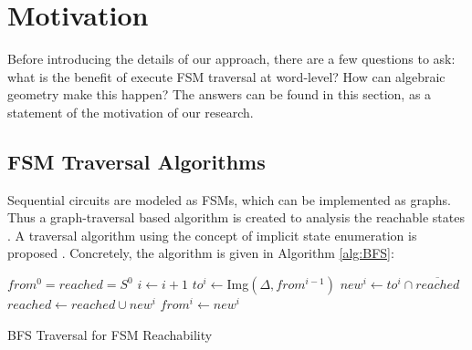 \section{Motivation}
Before introducing the details of our approach, there are a few questions to ask: what is 
the benefit of execute FSM traversal at word-level? How can algebraic geometry make this happen?
The answers can be found in this section, as a statement of the motivation of our research.

\subsection{FSM Traversal Algorithms}
Sequential circuits are modeled as FSMs, which can be implemented as graphs. Thus a 
graph-traversal based algorithm is created to analysis the reachable states \cite{coudert2003unified}.
A traversal algorithm using the concept of implicit state enumeration is proposed \cite{cho1993redundancy}.
Concretely, the algorithm is given in Algorithm \ref{alg:BFS}:

% 

\IncMargin{1em}
\begin{algorithm}[hbt]
\SetAlgoNoLine
\LinesNumbered
\Indm
\Indp

  $from^0 = reached = S^0$\;
  {
  	$i \gets i + 1$\;
	$to^i \gets$Img$(\Delta, from^{i-1})$\;
	$new^i \gets to^i \cap \overline{reached}$\;
  	$reached \gets reached \cup new^i$\;
	$from^i \gets new^i$\;
  }
\caption {BFS Traversal for FSM Reachability}\label{alg:BFS}
\end{algorithm}
\DecMargin{1em}

